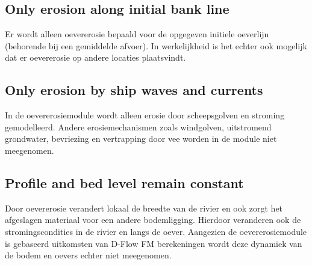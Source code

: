 \subsection{Only erosion along initial bank line}

Er wordt alleen oevererosie bepaald voor de opgegeven initiele oeverlijn (behorende bij een gemiddelde afvoer).
In werkelijkheid is het echter ook mogelijk dat er oevererosie op andere locaties plaatsvindt.

\subsection{Only erosion by ship waves and currents}

In de oevererosiemodule wordt alleen erosie door scheepsgolven en stroming gemodelleerd.
Andere erosiemechanismen zoals windgolven, uitstromend grondwater, bevriezing en vertrapping door vee worden in de module niet meegenomen.

\subsection{Profile and bed level remain constant}

Door oevererosie verandert lokaal de breedte van de rivier en ook zorgt het afgeslagen materiaal voor een andere bodemligging.
Hierdoor veranderen ook de stromingscondities in de rivier en langs de oever.
Aangezien de oevererosiemodule is gebaseerd uitkomsten van D-Flow FM berekeningen wordt deze dynamiek van de bodem en oevers echter niet meegenomen.
